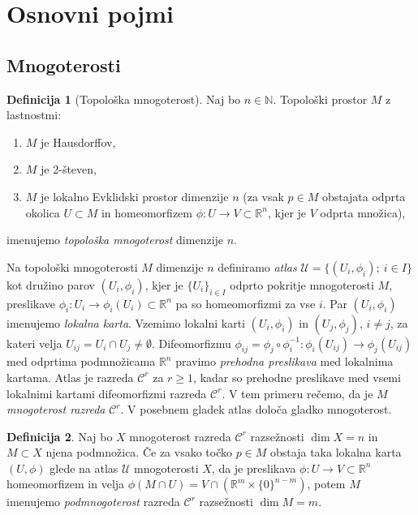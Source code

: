 \documentclass[12pt,a4paper,twoside]{article}
\theoremstyle{definition} %
\newtheorem{definicija}{Definicija}[section]
\theoremstyle{plain} %
\numberwithin{equation}{section}  %
\newcommand{\R}{\mathbb R}
\newcommand{\N}{\mathbb N}
\begin{document}
\clearpage
\section{Osnovni pojmi}

\subsection{Mnogoterosti}

\begin{definicija} [Topološka mnogoterost]
Naj bo $n \in \N$. Topološki prostor $M$ z lastnostmi:
\begin{enumerate}
\item $M$ je Hausdorffov,
\item $M$ je 2-števen,
\item $M$ je lokalno Evklidski prostor dimenzije $n$ (za vsak $p \in M$ obstajata odprta okolica $U \subset M$ in homeomorfizem $\phi \colon U \to V \subset \R^{n}$, kjer je $V$ odprta množica),
\end{enumerate}
imenujemo \emph{topološka mnogoterost} dimenzije $n$.
\end{definicija}

Na topološki mnogoterosti $M$ dimenzije $n$ definiramo \emph{atlas} $\mathcal{U} = \{ (U_{i}, \phi_{i}) ; \ i \in I \}$ kot družino parov $(U_{i}, \phi_{i})$, kjer je $\{ U_{i} \}_{i \in I}$ odprto pokritje mnogoterosti $M$, preslikave $\phi_{i} \colon U_{i} \to \phi_{i}(U_{i}) \subset \R^{n}$ pa so homeomorfizmi za vse $i$. Par $(U_{i}, \phi_{i})$ imenujemo \emph{lokalna karta}.
Vzemimo lokalni karti $(U_{i}, \phi_{i})$ in $(U_{j}, \phi_{j})$, $i \neq j$, za kateri velja $U_{ij}=U_{i} \cap U_{j} \neq \emptyset$. Difeomorfizmu $\phi_{ij} = \phi_{j} \circ \phi_{i}^{-1} \colon \phi_{i}(U_{ij}) \to \phi_{j}(U_{ij})$ med odprtima podmnožicama $\R^{n}$ pravimo \emph{prehodna preslikava} med lokalnima kartama. Atlas je razreda $\mathcal{C}^{r}$ za $r \geq 1$, kadar so prehodne preslikave med vsemi lokalnimi kartami difeomorfizmi razreda $\mathcal{C}^{r}$. V tem primeru rečemo, da je $M$ \emph{mnogoterost razreda} $\mathcal{C}^{r}$.
V posebnem gladek atlas določa gladko mnogoterost.

\begin{definicija}
Naj bo $X$ mnogoterost razreda $\mathcal{C}^{r}$ razsežnosti $\dim X = n$ in $M \subset X$ njena podmnožica. Če za vsako točko $p \in M$ obstaja taka lokalna karta $(U, \phi)$ glede na atlas $\mathcal{U}$ mnogoterosti $X$, da je preslikava $\phi \colon U \to V \subset \mathbb{R}^{n}$ homeomorfizem in velja $\phi (M \cap U) = V \cap (\mathbb{R}^{m} \times \{0\}^{n-m})$, potem $M$ imenujemo \emph{podmnogoterost} razreda $\mathcal{C}^{r}$ razsežnosti $\dim M = m$.
\end{definicija}
\end{document}
